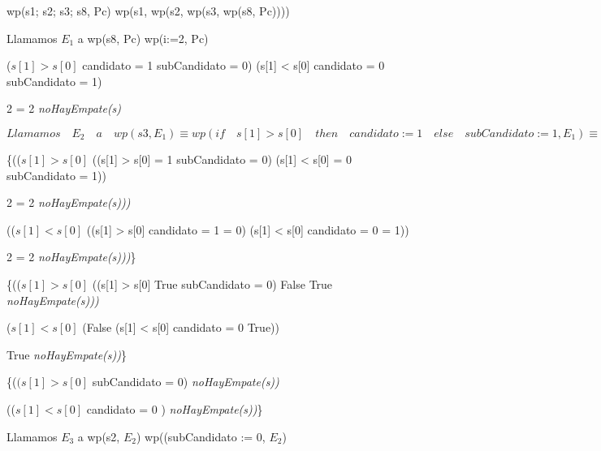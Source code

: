 \documentclass[10pt,a4paper]{article}
\begin{document}
    \vspace{5mm}
    
    wp(s1; s2; s3; s8, Pc) \equiv wp(s1, wp(s2, wp(s3, wp(s8, Pc))))
    
    \vspace{5mm}
    Llamamos $E_1$ a wp(s8, Pc) \equiv wp(i:=2, Pc) \equiv 
    
   ($s[1] > s[0]$ \wedge  candidato = 1 \wedge subCandidato = 0) \lor  (s[1] < s[0] \wedge candidato = 0 \wedge subCandidato = 1) \wedge 
    
    2 = 2 \wedge \textit{noHayEmpate(s)}
    
    \vspace{7mm}
    
    $Llamamos\quad E_2\quad a\quad wp(s3, E_1) \equiv wp(if\quad s[1] > s[0]\quad then\quad candidato := 1 \quad else\quad subCandidato :=1, E_1)  \equiv$

\vspace{2mm}
    
    \{(($s[1] > s[0]$ \wedge ((s[1] > s[0]  = 1 \wedge subCandidato = 0) \lor  (s[1] < s[0]  = 0 \wedge subCandidato = 1)) \wedge 
    
    2 = 2 \wedge \textit{noHayEmpate(s)))} \lor
    
    (($s[1] < s[0]$ \wedge ((s[1] > s[0] \wedge candidato = 1  = 0) \lor  (s[1] < s[0] \wedge candidato = 0  = 1)) \wedge 
    
    2 = 2 \wedge \textit{noHayEmpate(s)))}\} \equiv

    \vspace{2mm}

    \{(($s[1] > s[0]$ \wedge ((s[1] > s[0] \wedge True \wedge subCandidato = 0) \lor  False \wedge True \wedge \textit{noHayEmpate(s)))} \lor
    
    ($s[1] < s[0]$ \wedge (False \lor  (s[1] < s[0] \wedge candidato = 0 \wedge True)) \wedge 
    
    True \wedge \textit{noHayEmpate(s))}\} \equiv

    \vspace{2mm}

    \{($(s[1] > s[0]$ \wedge subCandidato = 0) \wedge \textit{noHayEmpate(s))} \lor
    
    (($s[1] < s[0]$ \wedge candidato = 0 ) \wedge \textit{noHayEmpate(s))}\}

    \vspace{7mm}

    Llamamos $E_3$ a wp(s2, $E_2$) \equiv wp((subCandidato := 0, $E_2$) \equiv
\end{document}
